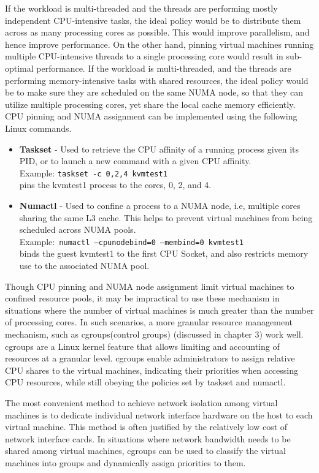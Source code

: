 If the workload is multi-threaded and the threads are performing mostly independent CPU-intensive tasks, the ideal policy would be to distribute them across as many processing cores as possible. This would improve parallelism, and hence improve performance. On the other hand, pinning virtual machines running multiple CPU-intensive threads to a single processing core would result in sub-optimal performance. If the workload is multi-threaded, and the threads are performing memory-intensive tasks with shared resources, the ideal policy would be to make sure they are scheduled on the same NUMA node, so that they can utilize multiple processing cores, yet share the local cache memory efficiently. CPU pinning and NUMA assignment can be implemented using the following Linux commands. 
\begin{itemize}
\item\textbf{ Taskset }\cite{taskset} - Used to retrieve the CPU affinity of a running process given its PID, or to launch a new command with a given CPU affinity. \\
Example: \texttt{taskset -c 0,2,4 kvmtest1} \\
pins the kvmtest1 process to the cores, 0, 2, and 4.
\item \textbf{Numactl} \cite{numactl} - Used to confine a process to a NUMA node, i.e, multiple cores sharing the same L3 cache. This helps to prevent virtual machines from being scheduled across NUMA pools.\\
Example:\texttt{ numactl --cpunodebind=0 --membind=0 kvmtest1 }\\
binds the guest kvmtest1 to the first CPU Socket, and also restricts memory use to the associated NUMA pool.
\end{itemize}
Though CPU pinning and NUMA node assignment limit virtual machines to confined resource pools, it may be impractical to use these mechanism in situations where the number of virtual machines is much greater than the number of processing cores. In such scenarios, a more granular resource management mechanism, such as cgroups(control groups) (discussed in chapter 3) work well. cgroups are a Linux kernel feature that allows limiting and accounting of resources at a granular level. cgroups enable administrators to assign relative CPU shares to the virtual machines, indicating their priorities when accessing CPU resources, while still obeying the policies set by taskset and numactl.


The most convenient method to achieve network isolation among virtual machines is to dedicate individual network interface hardware on the host to each virtual machine. This method is often justified by the relatively low cost of network interface cards. In situations where network bandwidth needs to be shared among virtual machines, cgroups can be used to classify the virtual machines into groups and dynamically assign priorities to them.

